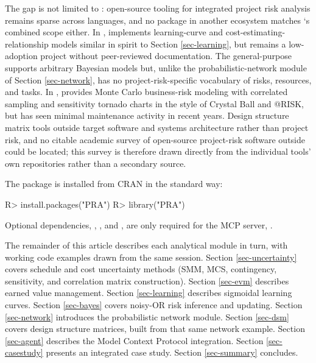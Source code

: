 \documentclass[
]{jss}
\begin{document}
The gap is not limited to : open-source tooling for
integrated project risk analysis remains sparse across languages, and no
package in another ecosystem matches `s combined scope either.
In ,  \citep{PyCostTools} implements
learning-curve and cost-estimating-relationship models similar in spirit
to Section \ref{sec-learning}, but remains a low-adoption project
without peer-reviewed documentation. The general-purpose 
\citep{PyMC2016} supports arbitrary Bayesian models but, unlike the
probabilistic-network module of Section \ref{sec-network}, has no
project-risk-specific vocabulary of risks, resources, and tasks. In
,  \citep{MCHammerJL} provides Monte
Carlo business-risk modeling with correlated sampling and sensitivity
tornado charts in the style of Crystal Ball and @RISK, but has seen
minimal maintenance activity in recent years. Design structure matrix
tools outside  target software and systems architecture
rather than project risk, and no citable academic survey of open-source
project-risk software outside  could be located; this survey
is therefore drawn directly from the individual tools' own repositories
rather than a secondary source.

The package is installed from CRAN in the standard way:

\begin{CodeChunk}
\begin{CodeInput}
R> install.packages("PRA")
R> library("PRA")
\end{CodeInput}
\end{CodeChunk}

Optional dependencies,  \citep{ellmer}, 
\citep{mcptools}, and  \citep{jsonlite}, are only required
for the MCP server, .

The remainder of this article describes each analytical module in turn,
with working code examples drawn from the same  session.
Section \ref{sec-uncertainty} covers schedule and cost uncertainty
methods (SMM, MCS, contingency, sensitivity, and correlation matrix
construction). Section \ref{sec-evm} describes earned value management.
Section \ref{sec-learning} describes sigmoidal learning curves. Section
\ref{sec-bayes} covers noisy-OR risk inference and updating. Section
\ref{sec-network} introduces the probabilistic network module. Section
\ref{sec-dsm} covers design structure matrices, built from that same
network example. Section \ref{sec-agent} describes the Model Context
Protocol integration. Section \ref{sec-casestudy} presents an integrated
case study. Section \ref{sec-summary} concludes.
\end{document}
